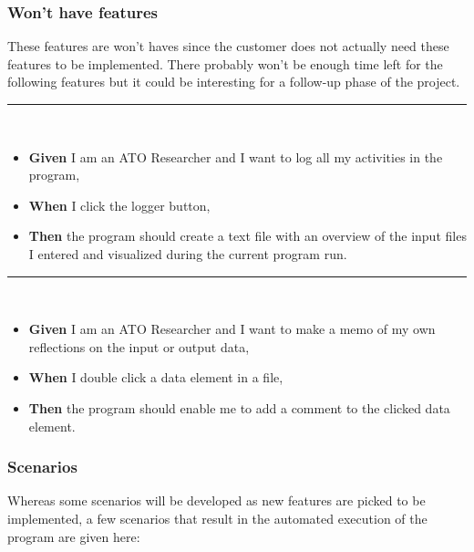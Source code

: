 \subsubsection{Won't have features} 
These features are won't haves since the customer does not actually need these features to be implemented. There probably won't be enough time left for the following features but it could be interesting for a follow-up phase of the project. 

\noindent\rule{8cm}{0.4pt}\\
\begin{itemize}
\item \textbf{Given} I am an ATO Researcher and I want to log all my activities in the program,
\item \textbf{When} I click the logger button,
\item \textbf{Then} the program should create a text file with an overview of the input files I entered and visualized during the current program run.
\end{itemize}
\noindent\rule{8cm}{0.4pt}\\
\begin{itemize}
\item \textbf{Given} I am an ATO Researcher and I want to make a memo of my own reflections on the input or output data,
\item \textbf{When} I double click a data element in a file,
\item \textbf{Then} the program should enable me to add a comment to the clicked data element.
\end{itemize}

\subsubsection{Scenarios}
Whereas some scenarios will be developed as new features are picked to be implemented, a few scenarios that result in the automated execution of the program are given here:

